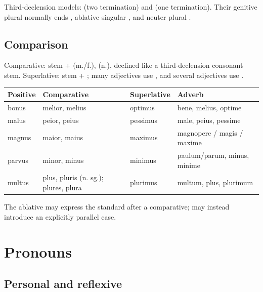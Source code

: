 Third-declension models:  (two termination) and
 (one termination). Their genitive plural normally ends
, ablative singular , and neuter plural .

\section{Comparison}

Comparative: stem +  (m./f.),  (n.), declined like a
third-declension consonant stem. Superlative: stem + ;
many  adjectives use , and several 
adjectives use .

\begin{tabularx}{\linewidth}{@{}lllY@{}}
  \toprule
  Positive & Comparative & Superlative & Adverb \\
  \midrule
  bonus & melior, melius & optimus & bene, melius, optime \\
  malus & peior, peius & pessimus & male, peius, pessime \\
  magnus & maior, maius & maximus & magnopere / magis / maxime \\
  parvus & minor, minus & minimus & paulum/parum, minus, minime \\
  multus & plus, pluris (n. sg.); plures, plura & plurimus & multum, plus,
       plurimum \\
  \bottomrule
\end{tabularx}

The ablative may express the standard after a comparative;  may
instead introduce an explicitly parallel case.

\chapter{Pronouns}


\section{Personal and reflexive}



